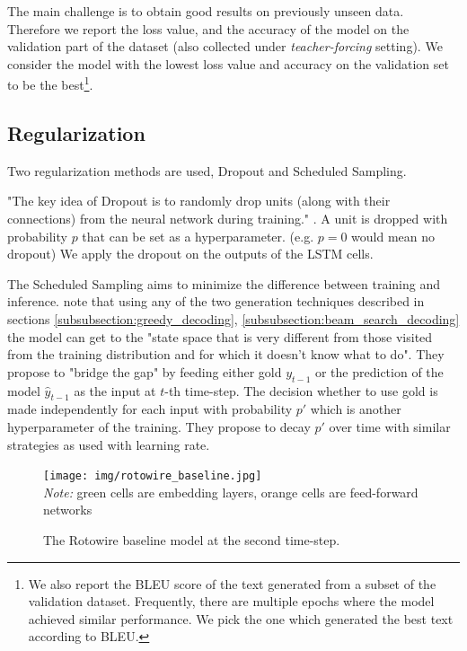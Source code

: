 The main challenge is to obtain good results on previously unseen data. Therefore we report the loss value, and the accuracy of the model on the validation part of the dataset (also collected under \emph{teacher-forcing} setting). We consider the model with the lowest loss value and accuracy on the validation set to be the best\footnote{We also report the BLEU score \citep{papineni2002} of the text generated from a subset of the validation dataset. Frequently, there are multiple epochs where the model achieved similar performance. We pick the one which generated the best text according to BLEU.}.

\subsection{Regularization} \label{subsection:regularization}

Two regularization methods are used, Dropout and Scheduled Sampling.

"The key idea of Dropout is to randomly drop units (along with their connections) from the neural network during training." \citep{srivastavaDropout2014}. A unit is dropped with probability $p$ that can be set as a hyperparameter. (e.g. $p = 0$ would mean no dropout)  We apply the dropout on the outputs of the LSTM cells.

The Scheduled Sampling aims to minimize the difference between training and inference. \citet{bengio2015scheduled} note that using any of the two generation techniques described in sections \ref{subsubsection:greedy_decoding}, \ref{subsubsection:beam_search_decoding} the model can get to the "state space that is very different from those visited from the training distribution and for which it doesn’t know what to do". They propose to "bridge the gap" by feeding either gold $y_{t-1}$ or the prediction of the model $\hat{y}_{t-1}$ as the input at $t$-th time-step. The decision whether to use gold is made independently for each input with probability $p'$ which is another hyperparameter of the training. They propose to decay $p'$ over time with similar strategies as used with learning rate.

\begin{figure}[!h]
    \centering
    \texttt{[image: img/rotowire\_baseline.jpg]}
    \footnotesize{\\ \textit{Note:} green cells are embedding layers, orange cells are feed-forward networks}
    \caption{\centering The Rotowire baseline model at the second time-step.} \label{figure:basline_model_visualization}
\end{figure}

